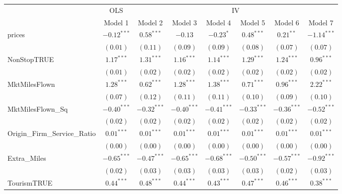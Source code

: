
\begin{tabular}{l c c c c c c c}
\toprule
 & \multicolumn{1}{c}{OLS} & \multicolumn{6}{c}{IV} \\
\cmidrule(lr){2-2} \cmidrule(lr){3-8}
 & Model 1 & Model 2 & Model 3 & Model 4 & Model 5 & Model 6 & Model 7 \\
\midrule
prices                       & $-0.12^{***}$ & $0.58^{***}$  & $-0.13$       & $-0.23^{*}$   & $0.48^{***}$     & $0.21^{**}$   & $-1.14^{***}$  \\
                             & $(0.01)$      & $(0.11)$      & $(0.09)$      & $(0.09)$      & $(0.08)$         & $(0.07)$      & $(0.07)$       \\
NonStopTRUE                  & $1.17^{***}$  & $1.31^{***}$  & $1.16^{***}$  & $1.14^{***}$  & $1.29^{***}$     & $1.24^{***}$  & $0.96^{***}$   \\
                             & $(0.01)$      & $(0.02)$      & $(0.02)$      & $(0.02)$      & $(0.02)$         & $(0.02)$      & $(0.02)$       \\
MktMilesFlown                & $1.28^{***}$  & $0.62^{***}$  & $1.28^{***}$  & $1.38^{***}$  & $0.71^{***}$     & $0.96^{***}$  & $2.22^{***}$   \\
                             & $(0.07)$      & $(0.12)$      & $(0.11)$      & $(0.11)$      & $(0.10)$         & $(0.09)$      & $(0.10)$       \\
MktMilesFlown\_Sq            & $-0.40^{***}$ & $-0.32^{***}$ & $-0.40^{***}$ & $-0.41^{***}$ & $-0.33^{***}$    & $-0.36^{***}$ & $-0.52^{***}$  \\
                             & $(0.02)$      & $(0.02)$      & $(0.02)$      & $(0.02)$      & $(0.02)$         & $(0.02)$      & $(0.02)$       \\
Origin\_Firm\_Service\_Ratio & $0.01^{***}$  & $0.01^{***}$  & $0.01^{***}$  & $0.01^{***}$  & $0.01^{***}$     & $0.01^{***}$  & $0.01^{***}$   \\
                             & $(0.00)$      & $(0.00)$      & $(0.00)$      & $(0.00)$      & $(0.00)$         & $(0.00)$      & $(0.00)$       \\
Extra\_Miles                 & $-0.65^{***}$ & $-0.47^{***}$ & $-0.65^{***}$ & $-0.68^{***}$ & $-0.50^{***}$    & $-0.57^{***}$ & $-0.92^{***}$  \\
                             & $(0.02)$      & $(0.03)$      & $(0.03)$      & $(0.03)$      & $(0.03)$         & $(0.02)$      & $(0.03)$       \\
TourismTRUE                  & $0.44^{***}$  & $0.48^{***}$  & $0.44^{***}$  & $0.43^{***}$  & $0.47^{***}$     & $0.46^{***}$  & $0.38^{***}$   \\

\end{tabular}
